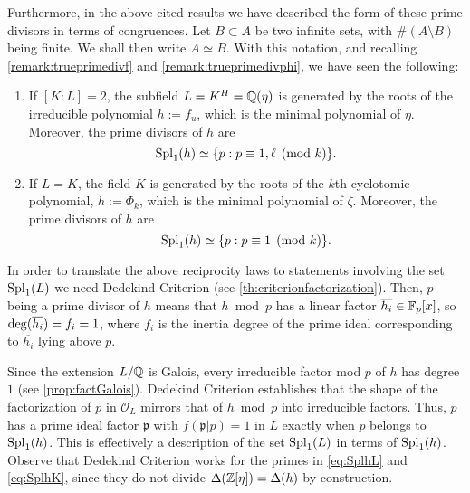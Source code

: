 \documentclass[../main.tex]{subfiles}
\begin{document}
Furthermore, in the above-cited results we have described the form of these prime divisors in terms of congruences.  Let $B\subset A$ be two infinite sets, with $\#(A\setminus B)$ being finite. We shall then write $A\simeq B$. With this notation, and recalling \cref{remark:trueprimedivf} and \cref{remark:trueprimedivphi}, we have seen the following:
\begin{enumerate}[label=(\alph*)]
	\item If $[K:L]=2$, the subfield $L=K^H=\mathbb{Q}(\eta)$ is generated by the roots of the irreducible polynomial $h:=f_u$, which is the minimal polynomial of $\eta$. Moreover, the prime divisors of $h$ are
	\begin{equation}\label{eq:SplhL}
		\operatorname{Spl}_1(h)\simeq\{p: p\equiv 1,\ell\pmod{k}\}.
	\end{equation}
	\item If $L=K$, the field $K$ is generated by the roots of the $k$th cyclotomic polynomial, $h:=\Phi_k$, which is the minimal polynomial of $\zeta$. Moreover, the prime divisors of $h$ are
	\begin{equation}\label{eq:SplhK}
		\operatorname{Spl}_1(h)\simeq\{p: p\equiv 1\pmod{k}\}.
	\end{equation}
\end{enumerate}

In order to translate the above reciprocity laws to statements involving the set $\operatorname{Spl}_1(L)$ we need Dedekind Criterion (see \cref{th:criterionfactorization}). Then, $p$ being a prime divisor of $h$ means that $h \bmod{p}$ has a linear factor $\overline{h_i}\in\mathbb{F}_p[x]$, so $\operatorname{deg}(\overline{h_i})=f_i=1$, where $f_i$ is the inertia degree of the prime ideal corresponding to $\overline{h_i}$ lying above $p$. 

Since the extension $L/\mathbb{Q}$ is Galois, every irreducible factor mod $p$ of $h$ has degree $1$ (see \cref{prop:factGalois}). Dedekind Criterion establishes that the shape of the factorization of $p$ in $\mathcal{O}_L$ mirrors that of $h \bmod{p}$ into irreducible factors. Thus, $p$ has a prime ideal factor $\mathfrak{p}$ with $f(\mathfrak{p}|p)=1$ in $L$ exactly when $p$ belongs to $\operatorname{Spl}_1(h)$. This is effectively a description of the set $\operatorname{Spl}_1(L)$ in terms of $\operatorname{Spl}_1(h)$. Observe that Dedekind Criterion works for the primes in \cref{eq:SplhL} and \cref{eq:SplhK}, since they do not divide $\Delta(\mathbb{Z}[\eta])=\Delta(h)$ by construction.
 
\end{document}
